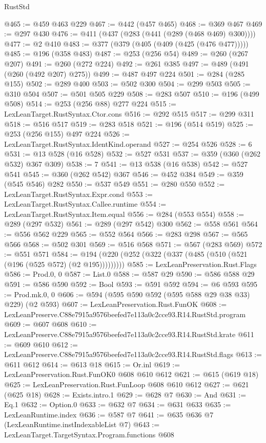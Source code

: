 \begin{lexlean}{RustStd}
\begin{coremodule}
@465 := @459 @463 @229
@467 := @442 (@457 @465)
@468 := @369 @467
@469 := @297 @430
@476 := @411 (@437 (@283 (@441 (@289 (@468 @469) @300))))
@477 := @2 @410
@483 := @377 (@379 (@405 (@409 (@425 (@476 @477)))))
@485 := @196 (@358 @483)
@487 := @253 (@256 @54)
@489 := @260 (@267 @207)
@491 := @260 (@272 @224)
@492 := @261 @385
@497 := @489 (@491 (@260 (@492 @207) @275))
@499 := @487 @497 @224
@501 := @284 (@285 @155)
@502 := @289 @400
@503 := @502 @300
@504 := @299 @503
@505 := @310 @504
@507 := @501 @505 @229
@508 := @283 @507
@510 := @196 (@499 @508)
@514 := @253 (@256 @88) @277 @224
@515 := LexLeanTarget.RustSyntax.Ctor.cons
@516 := @292 @515
@517 := @299 @311
@518 := @516 @517
@519 := @283 @518
@521 := @196 (@514 @519)
@525 := @253 (@256 @155) @497 @224
@526 := LexLeanTarget.RustSyntax.IdentKind.operand
@527 := @254 @526
@528 := 6
@531 := @13 @528 (@16 @528)
@532 := @527 @531
@537 := @359 (@360 (@262 @532) @367 @309)
@538 := 7
@541 := @13 @538 (@16 @538)
@542 := @527 @541
@545 := @360 (@262 @542) @367
@546 := @452 @384
@549 := @359 (@545 @546) @282
@550 := @537 @549
@551 := @280 @550
@552 := LexLeanTarget.RustSyntax.Expr.cond
@553 := LexLeanTarget.RustSyntax.Callee.runtime
@554 := LexLeanTarget.RustSyntax.Item.equal
@556 := @284 (@553 @554)
@558 := @289 (@297 @532)
@561 := @289 (@297 @542) @300
@562 := @558 @561
@564 := @556 @562 @229
@565 := @552 @564
@566 := @283 @298
@567 := @565 @566
@568 := @502 @301
@569 := @516 @568
@571 := @567 (@283 @569)
@572 := @551 @571
@584 := @194 (@220 (@252 (@322 (@337 (@485 (@510 (@521 (@196 (@525 @572) (@2 @195)))))))))
@585 := LexLeanPreservation.Rust.Flags
@586 := Prod.{0, 0}
@587 := List.{0}
@588 := @587 @29
@590 := @586 @588 @29
@591 := @586 @590
@592 := Bool
@593 := @591 @592
@594 := @6 @593
@595 := Prod.mk.{0, 0}
@606 := @594 (@595 @590 @592 (@595 @588 @29 @38 @33) @229) (@2 @593)
@607 := LexLeanPreservation.Rust.FunOK
@608 := LexLeanPreserve.C88e7915a9576beefed7e113a0c2cce93.R14.RustStd.program
@609 := @607 @608
@610 := LexLeanPreserve.C88e7915a9576beefed7e113a0c2cce93.R14.RustStd.krate
@611 := @609 @610
@612 := LexLeanPreserve.C88e7915a9576beefed7e113a0c2cce93.R14.RustStd.flags
@613 := @611 @612
@614 := @613 @18
@615 := Or.inl
@619 := LexLeanPreservation.Rust.FunOK0 @608 @610 @612
@621 := @615 (@619 @18)
@625 := LexLeanPreservation.Rust.FunLoop @608 @610 @612
@627 := @621 (@625 @18)
@628 := Exists.intro.{1}
@629 := @628 @7
@630 := And
@631 := Eq.{1}
@632 := Option.{0}
@633 := @632 @7
@634 := @631 @633
@635 := LexLeanRuntime.index
@636 := @587 @7
@641 := @635 @636 @7 (LexLeanRuntime.instIndexableList @7)
@643 := LexLeanTarget.TargetSyntax.Program.functions @608

\end{coremodule}
\end{lexlean}
